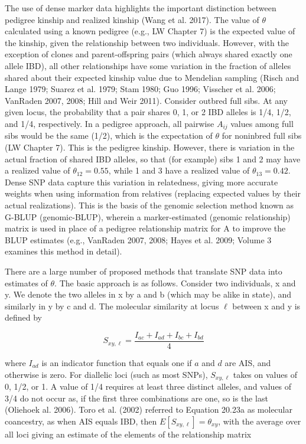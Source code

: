 \documentclass{article}
\begin{document}
The use of dense marker data highlights the important distinction between pedigree kinship and realized kinship (Wang et al. 2017). The value of  $ \theta $ calculated using a known pedigree (e.g., LW Chapter 7) is the expected value of the kinship, given the relationship between two individuals. However, with the exception of clones and parent-offspring pairs (which always shared exactly one allele IBD), all other relationships have some variation in the fraction of alleles shared about their expected kinship value due to Mendelian sampling (Risch and Lange 1979; Suarez et al. 1979; Stam 1980; Guo 1996; Visscher et al. 2006; VanRaden 2007, 2008; Hill and Weir 2011). Consider outbred full sibs. At any given locus, the probability that a pair shares 0, 1, or 2 IBD alleles is 1/4, 1/2, and 1/4, respectively. In a pedigree approach, all pairwise  $ A_{ij} $ values among full sibs would be the same (1/2), which is the expectation of  $ \theta $ for noninbred full sibs (LW Chapter 7). This is the pedigree kinship. However, there is variation in the actual fraction of shared IBD alleles, so that (for example) sibs 1 and 2 may have a realized value of  $ \theta_{12} = 0.55 $, while 1 and 3 have a realized value of  $ \theta_{13} = 0.42 $. Dense SNP data capture this variation in relatedness, giving more accurate weights when using information from relatives (replacing expected values by their actual realizations). This is the basis of the genomic selection method known as G-BLUP (genomic-BLUP), wherein a marker-estimated (genomic relationship) matrix is used in place of a pedigree relationship matrix for A to improve the BLUP estimates (e.g., VanRaden 2007, 2008; Hayes et al. 2009; Volume 3 examines this method in detail).

There are a large number of proposed methods that translate SNP data into estimates of  $ \theta $. The basic approach is as follows. Consider two individuals, x and y. We denote the two alleles in x by a and b (which may be alike in state), and similarly in y by c and d. The molecular similarity at locus  $ \ell $ between x and y is defined by

\begin{equation}
S_{xy,\ell}=\frac{I_{ac}+I_{ad}+I_{bc}+I_{bd}}{4}
\tag{20.23a}
\label{eq:20_23a}
\end{equation}

where  $ I_{ad} $ is an indicator function that equals one if  $ a $ and  $ d $ are AIS, and otherwise is zero. For diallelic loci (such as most SNPs),  $ S_{xy,\ell} $ takes on values of 0, 1/2, or 1. A value of 1/4 requires at least three distinct alleles, and values of 3/4 do not occur as, if the first three combinations are one, so is the last (Oliehoek al. 2006). Toro et al. (2002) referred to Equation 20.23a as molecular coancestry, as when AIS equals IBD, then  $ E[S_{xy,\ell}] = \theta_{xy} $, with the average over all loci giving an estimate of the elements of the relationship matrix
\end{document}
